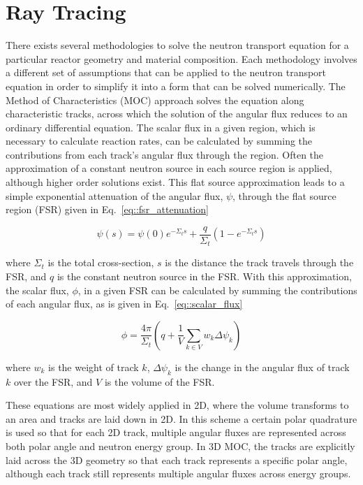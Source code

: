 \chapter{Ray Tracing}
\label{chap:ray-tracing}

There exists several methodologies to solve the neutron transport equation for a particular reactor geometry and material composition. Each methodology involves a different set of assumptions that can be applied to the neutron transport equation in order to simplify it into a form that can be solved numerically. The Method of Characteristics (MOC) approach solves the equation along characteristic tracks, across which the solution of the angular flux reduces to an ordinary differential equation. The scalar flux in a given region, which is necessary to calculate reaction rates, can be calculated by summing the contributions from each track's angular flux through the region. Often the approximation of a constant neutron source in each source region is applied, although higher order solutions exist. This flat source approximation leads to a simple exponential attenuation of the angular flux, $\psi$, through the flat source region (FSR) given in Eq.~\ref{eq::fsr_attenuation}

\begin{equation}
\psi(s) = \psi(0) e^{-\Sigma_t s} + \frac{q}{\Sigma_t} \left( 1 - e^{-\Sigma_t s} \right)
\label{eq::fsr_attenuation}
\end{equation}

where $\Sigma_t$ is the total cross-section, $s$ is the distance the track travels through the FSR, and $q$ is the constant neutron source in the FSR. With this approximation, the scalar flux, $\phi$, in a given FSR can be calculated by summing the contributions of each angular flux, as is given in Eq.~\ref{eq::scalar_flux}

\begin{equation}
\phi = \frac{4\pi}{\Sigma_t} \left(q + \frac{1}{V} \sum_{k\in V} w_k \Delta \psi_k \right)
\label{eq::scalar_flux}
\end{equation}

where $w_k$ is the weight of track $k$, $\Delta \psi_k$ is the change in the angular flux of track $k$ over the FSR, and $V$ is the volume of the FSR.

These equations are most widely applied in 2D, where the volume transforms to an area and tracks are laid down in 2D. In this scheme a certain polar quadrature is used so that for each 2D track, multiple angular fluxes are represented across both polar angle and neutron energy group. In 3D MOC, the tracks are explicitly laid across the 3D geometry so that each track represents a specific polar angle, although each track still represents multiple angular fluxes across energy groups. 

